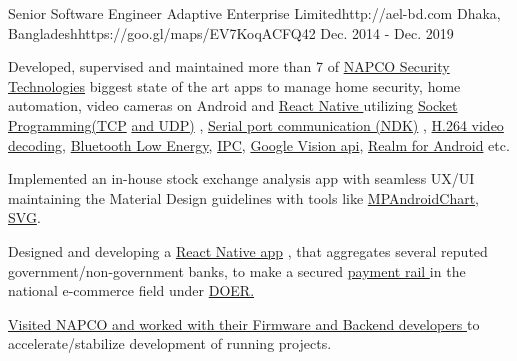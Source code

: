 \begin{workentries}
\workentry
{Senior Software Engineer} %
{Adaptive Enterprise Limited}{http://ael-bd.com} %
{Dhaka, Bangladesh}{https://goo.gl/maps/EV7KoqACFQ42} %
{Dec. 2014 - Dec. 2019} %
    {
      \begin{workitems} %
        \item {Developed, supervised and maintained more than 7 of
        {\href{http://www.napcosecurity.com}{NAPCO Security Technologies}}
        biggest state of the art apps to manage home security, home automation, video cameras on Android and 
        {\href{https://facebook.github.io/react-native/}{React Native }}
        utilizing 
        {\href{https://www.geeksforgeeks.org/socket-programming-in-java/}{Socket Programming(TCP}}
        {\href{https://www.geeksforgeeks.org/working-udp-datagramsockets-java/}{and UDP)}}
        , 
        {\href{https://github.com/cepr/android-serialport-api/tree/master/android-serialport-api/project}{Serial port communication (NDK)}}
        , 
        {\href{https://ieeexplore.ieee.org/document/1410457}{H.264 video decoding}}, 
        {\href{https://en.wikipedia.org/wiki/Bluetooth_Low_Energy}{Bluetooth Low Energy}}, 
        {\href{https://developer.android.com/guide/components/aidl}{IPC}}, 
        {\href{https://developers.google.com/vision/}{Google Vision api}}, 
        {\href{https://realm.io}{Realm for Android}}
        etc.}
        \item {Implemented an in-house stock exchange analysis app with seamless UX/UI maintaining the Material Design guidelines with tools like
        {\href{https://github.com/PhilJay/MPAndroidChart}{MPAndroidChart}},
        {\href{https://www.sitepoint.com/svg-101-what-is-svg/}{SVG}.}
        }
        \item {Designed and developing a 
        {\href{https://facebook.github.io/react-native/}{React Native app}}
        , that aggregates several reputed government/non-government banks, to make a secured 
        {\href{https://www.paymentrails.com}{payment rail }}
        in the national 
        e-commerce field under 
        {\href{http://doer.com.bd}{DOER.}}
        }
        \item {\href{https://drive.google.com/open?id=1j3ffYnrOgq29SupVo5lvn_BiN_UI0ly_}{Visited NAPCO and worked with their Firmware and Backend developers }
        to accelerate/stabilize development of running projects.}
      \end{workitems}
    }


\end{workentries}
